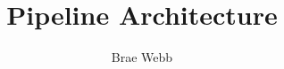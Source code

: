 \documentclass{csse4400}
\title{Pipeline Architecture}
\author{Brae Webb}
\date{\week{2}}
\begin{document}
\makecover



% 
% 
\end{document}
